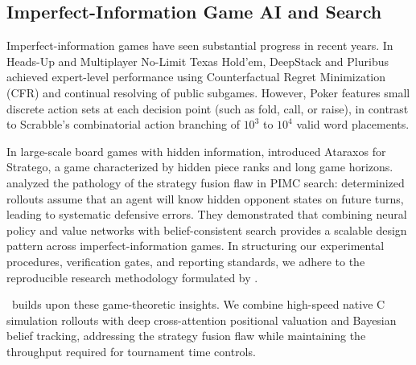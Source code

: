 \subsection{Imperfect-Information Game AI and Search}

Imperfect-information games have seen substantial progress in recent years. In Heads-Up and Multiplayer No-Limit Texas Hold'em, DeepStack \citep{moravcik2017deepstack} and Pluribus \citep{brown2019superhuman} achieved expert-level performance using Counterfactual Regret Minimization (CFR) and continual resolving of public subgames. However, Poker features small discrete action sets at each decision point (such as fold, call, or raise), in contrast to Scrabble's combinatorial action branching of $10^3$ to $10^4$ valid word placements.

In large-scale board games with hidden information, \citet{sokota2026scalable} introduced Ataraxos for Stratego, a game characterized by hidden piece ranks and long game horizons. \citet{sokota2026scalable} analyzed the pathology of the strategy fusion flaw in PIMC search: determinized rollouts assume that an agent will know hidden opponent states on future turns, leading to systematic defensive errors. They demonstrated that combining neural policy and value networks with belief-consistent search provides a scalable design pattern across imperfect-information games. In structuring our experimental procedures, verification gates, and reporting standards, we adhere to the reproducible research methodology formulated by \citet{kassis2026scientific}.

\algo\ builds upon these game-theoretic insights. We combine high-speed native C simulation rollouts with deep cross-attention positional valuation and Bayesian belief tracking, addressing the strategy fusion flaw while maintaining the throughput required for tournament time controls.
